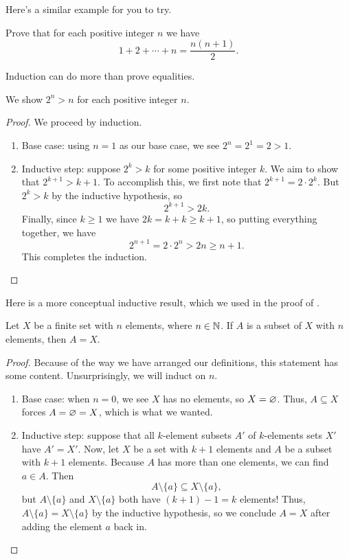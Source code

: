 \documentclass[../main.tex]{subfiles}
\begin{document}
Here's a similar example for you to try.
\begin{exercise}
    Prove that for each positive integer $n$ we have
    \[1+2+\cdots+n = \frac{n(n + 1)}{2}.\]
\end{exercise}
Induction can do more than prove equalities.
\begin{example}
    We show $2^n > n$ for each positive integer $n$.
\end{example}
\begin{proof}
    We proceed by induction.
    \begin{enumerate}
        \item Base case: using $n=1$ as our base case, we see $2^n = 2^1 = 2>1$.
        \item Inductive step: suppose $2^k > k$ for some positive integer $k$. We aim to show that $2^{k + 1} > k + 1$. To accomplish this, we first note that $2^{k + 1} = 2 \cdot 2^k$. But $2^k > k$ by the inductive hypothesis, so
        \[2^{k + 1} > 2k.\]
        Finally, since $k \geq 1$ we have $2k = k + k \geq k + 1$, so putting everything together, we have
        \[2^{n + 1} = 2 \cdot 2^n > 2n \geq n + 1.\]
        This completes the induction.
        \qedhere
    \end{enumerate}
\end{proof}
Here is a more conceptual inductive result, which we used in the proof of .
\begin{prop} \label{prop:dedekind-finite}
    Let $X$ be a finite set with $n$ elements, where $n\in\mathbb N$. If $A$ is a subset of $X$ with $n$ elements, then $A=X$.
\end{prop}
\begin{proof}
    Because of the way we have arranged our definitions, this statement has some content. Unsurprisingly, we will induct on $n$.
    \begin{enumerate}
        \item Base case: when $n=0$, we see $X$ has no elements, so $X=\varnothing$. Thus, $A\subseteq X$ forces $A=\varnothing=X$, which is what we wanted.
        \item Inductive step: suppose that all $k$-element subsets $A'$ of $k$-elements sets $X'$ have $A'=X'$. Now, let $X$ be a set with $k+1$ elements and $A$ be a subset with $k+1$ elements. Because $A$ has more than one elements, we can find $a\in A$. Then
        \[A\setminus\{a\}\subseteq X\setminus\{a\},\]
        but $A\setminus\{a\}$ and $X\setminus\{a\}$ both have $(k+1)-1=k$ elements! Thus, $A\setminus\{a\}=X\setminus\{a\}$ by the inductive hypothesis, so we conclude $A=X$ after adding the element $a$ back in.
        \qedhere
    \end{enumerate}
\end{proof}
\end{document}
